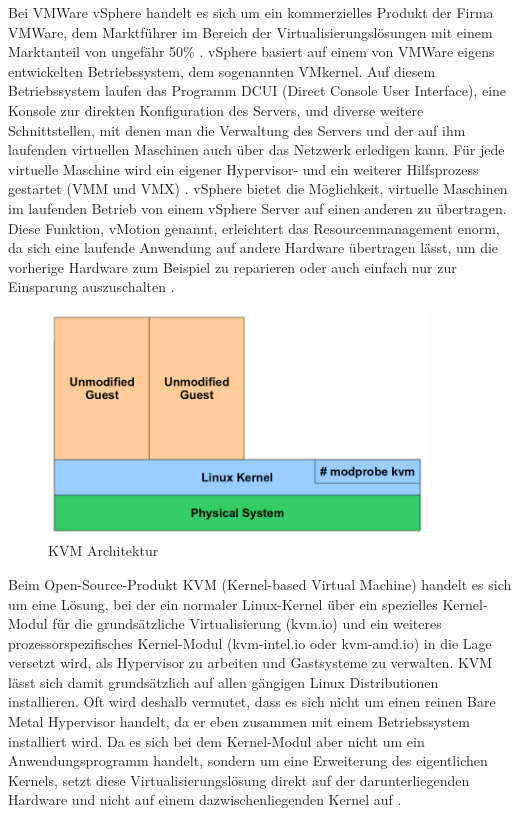 Bei VMWare vSphere handelt es sich um ein kommerzielles Produkt der Firma VMWare, dem Marktführer im Bereich der Virtualisierungslösungen mit einem Marktanteil von ungefähr 50\% \citep[Vgl.][]{vmware:001}. vSphere basiert auf einem von VMWare eigens entwickelten Betriebssystem, dem sogenannten VMkernel. Auf diesem Betriebssystem laufen das Programm DCUI (Direct Console User Interface), eine Konsole zur direkten Konfiguration des Servers, und diverse weitere Schnittstellen, mit denen man die Verwaltung des Servers und der auf ihm laufenden virtuellen Maschinen auch über das Netzwerk erledigen kann. Für jede virtuelle Maschine wird ein eigener Hypervisor- und ein weiterer Hilfsprozess gestartet (VMM und VMX) \citep[Vgl.][S. 3]{vmware:002}. vSphere bietet die Möglichkeit, virtuelle Maschinen im laufenden Betrieb von einem vSphere Server auf einen anderen zu übertragen. Diese Funktion, vMotion genannt, erleichtert das Resourcenmanagement enorm, da sich eine laufende Anwendung auf andere Hardware übertragen lässt, um die vorherige Hardware zum Beispiel zu reparieren oder auch einfach nur zur Einsparung auszuschalten \citep[Vgl.][S. 4]{wmware:003}.

\begin{figure}[!ht]
  \begin{center}
    \includegraphics[width=10cm]{bilder/kvm.png}
    \caption{KVM Architektur \citep{kvm:002}}
  \end{center}
\end{figure}

Beim Open-Source-Produkt KVM (Kernel-based Virtual Machine) handelt es sich um eine Lösung, bei der ein normaler Linux-Kernel über ein spezielles Kernel-Modul für die grundsätzliche Virtualisierung (kvm.io) und ein weiteres prozessorspezifisches Kernel-Modul (kvm-intel.io oder kvm-amd.io) in die Lage versetzt wird, als Hypervisor zu arbeiten und Gastsysteme zu verwalten. KVM lässt sich damit grundsätzlich auf allen gängigen Linux Distributionen installieren. Oft wird deshalb vermutet, dass es sich nicht um einen reinen Bare Metal Hypervisor handelt, da er eben zusammen mit einem Betriebssystem installiert wird. Da es sich bei dem Kernel-Modul aber nicht um ein Anwendungsprogramm handelt, sondern um eine Erweiterung des eigentlichen Kernels, setzt diese Virtualisierungslösung direkt auf der darunterliegenden Hardware und nicht auf einem dazwischenliegenden Kernel auf \citep[Vgl.][S. 225 - 227]{KivKam07}.

